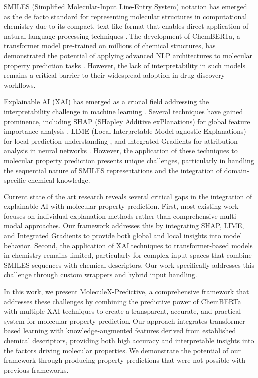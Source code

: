 \documentclass[preprint,12pt]{elsarticle}
\begin{document}
SMILES (Simplified Molecular-Input Line-Entry System) notation has emerged as the de facto standard for representing molecular structures in computational chemistry due to its compact, text-like format that enables direct application of natural language processing techniques \cite{weininger1988smiles}. The development of ChemBERTa, a transformer model pre-trained on millions of chemical structures, has demonstrated the potential of applying advanced NLP architectures to molecular property prediction tasks \cite{chithrananda2020chemberta}. However, the lack of interpretability in such models remains a critical barrier to their widespread adoption in drug discovery workflows.

Explainable AI (XAI) has emerged as a crucial field addressing the interpretability challenge in machine learning \cite{arrieta2020explainable,lundberg2017shap}. Several techniques have gained prominence, including SHAP (SHapley Additive exPlanations) for global feature importance analysis \cite{lundberg2017shap}, LIME (Local Interpretable Model-agnostic Explanations) for local prediction understanding \cite{ribeiro2016lime}, and Integrated Gradients for attribution analysis in neural networks \cite{sundararajan2017axiomatic}. However, the application of these techniques to molecular property prediction presents unique challenges, particularly in handling the sequential nature of SMILES representations and the integration of domain-specific chemical knowledge.

Current state of the art research reveals several critical gaps in the integration of explainable AI with molecular property prediction. First, most existing work focuses on individual explanation methods rather than comprehensive multi-modal approaches. Our framework addresses this by integrating SHAP, LIME, and Integrated Gradients to provide both global and local insights into model behavior. Second, the application of XAI techniques to transformer-based models in chemistry remains limited, particularly for complex input spaces that combine SMILES sequences with chemical descriptors. Our work specifically addresses this challenge through custom wrappers and hybrid input handling.

In this work, we present MoleculeX-Predictive, a comprehensive framework that addresses these challenges by combining the predictive power of ChemBERTa with multiple XAI techniques to create a transparent, accurate, and practical system for molecular property prediction. Our approach integrates transformer-based learning with knowledge-augmented features derived from established chemical descriptors, providing both high accuracy and interpretable insights into the factors driving molecular properties. We demonstrate the potential of our framework through producing property predictions that were not possible with previous frameworks. 
\end{document}
